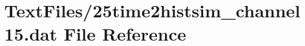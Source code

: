 \hypertarget{25time2histsim__channel15_8dat}{}\section{Text\+Files/25time2histsim\+\_\+channel15.dat File Reference}
\label{25time2histsim__channel15_8dat}
